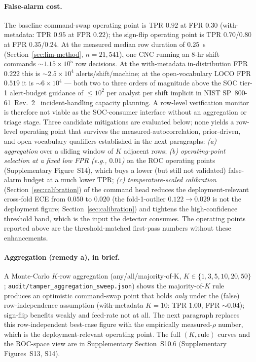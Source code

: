 \documentclass[11pt,a4paper]{article}
\begin{document}
\paragraph{False-alarm cost.} The baseline command-swap operating point is TPR $0.92$ at FPR $0.30$ (with-metadata: TPR $0.95$ at FPR $0.22$); the sign-flip operating point is TPR $0.70$/$0.80$ at FPR $0.35$/$0.24$. At the measured median row duration of $0.25$~s (Section~\ref{sec:lim-method}, $n\!=\!21{,}541$), one CNC running an 8-hr shift commands $\sim$$1.15\!\times\!10^{5}$ row decisions. At the with-metadata in-distribution FPR $0.222$ this is $\sim$$2.5\!\times\!10^{4}$ alerts/shift/machine; at the open-vocabulary LOCO FPR $0.519$ it is $\sim$$6\!\times\!10^{4}$ --- both two to three orders of magnitude above the SOC tier-1 alert-budget guidance of $\le\!10^{2}$ per analyst per shift implicit in NIST SP~800-61~Rev.~2~\cite{nist2012sp80061} incident-handling capacity planning. A row-level verification monitor is therefore not viable as the SOC-consumer interface without an aggregation or triage stage. Three candidate mitigations are evaluated below; none yields a row-level operating point that survives the measured-autocorrelation, prior-driven, and open-vocabulary qualifiers established in the next paragraphs: \emph{(a) aggregation} over a sliding window of $K$ adjacent rows; \emph{(b) operating-point selection at a fixed low FPR (e.g., $0.01$)} on the ROC operating points (Supplementary Figure~S14), which buys a lower (but still not validated) false-alarm budget at a much lower TPR; \emph{(c) temperature-scaled calibration} (Section~\ref{sec:calibration}) of the command head reduces the deployment-relevant cross-fold ECE from $0.050$ to $0.020$ (the fold-1-outlier $0.122 \to 0.029$ is not the deployment figure; Section~\ref{sec:calibration}) and tightens the high-confidence threshold band, which is the input the detector consumes. The operating points reported above are the threshold-matched first-pass numbers without these enhancements.

\paragraph{Aggregation (remedy a), in brief.} A Monte-Carlo $K$-row aggregation (any/all/majority-of-K, $K\!\in\!\{1,3,5,10,20,50\}$; \texttt{audit/tamper\_aggregation\_sweep.json}) shows the majority-of-$K$ rule produces an optimistic command-swap point that holds \emph{only} under the (false) row-independence assumption (with-metadata $K\!=\!10$: TPR $1.00$, FPR $\sim\!0.04$); sign-flip benefits weakly and feed-rate not at all. The next paragraph replaces this row-independent best-case figure with the empirically measured-$\rho$ number, which is the deployment-relevant operating point. The full $(K, \text{rule})$ curves and the ROC-space view are in Supplementary Section~S10.6 (Supplementary Figures~S13, S14).
\end{document}
